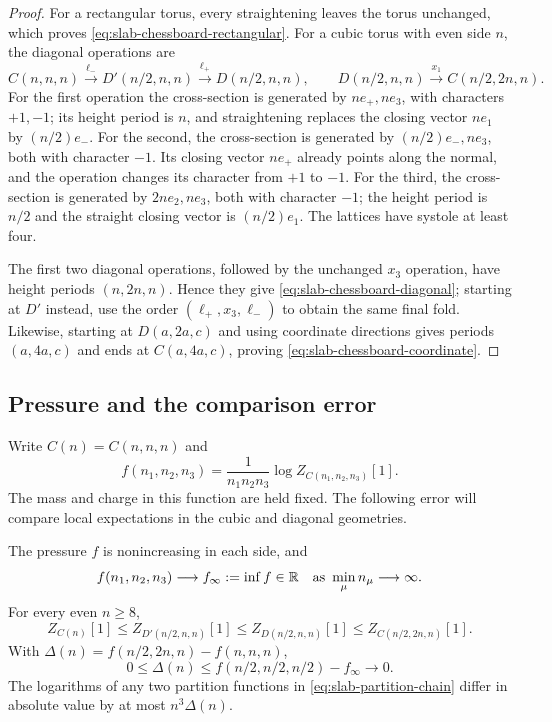 \begin{proof}
For a rectangular torus, every straightening leaves the torus unchanged,
which proves \eqref{eq:slab-chessboard-rectangular}. For a cubic torus
with even side $n$, the diagonal operations are
\begin{equation}\label{eq:slab-three-untwistings}
 C(n,n,n)\xrightarrow{\ell_-}D'(n/2,n,n)
          \xrightarrow{\ell_+}D(n/2,n,n),
 \qquad D(n/2,n,n)\xrightarrow{x_1}C(n/2,2n,n).
\end{equation}
For the first operation the cross-section is generated by $ne_+,ne_3$,
with characters $+1,-1$; its height period is $n$, and straightening
replaces the closing vector $ne_1$ by $(n/2)e_-$. For the second, the
cross-section is generated by $(n/2)e_-,ne_3$, both with character
$-1$. Its closing vector $ne_+$ already points along the normal,
and the operation changes its character from $+1$ to $-1$. For the
third, the cross-section is generated by $2ne_2,ne_3$, both with
character $-1$; the height period is $n/2$ and the straight closing
vector is $(n/2)e_1$. The lattices have systole at least four.

The first two diagonal operations, followed by the unchanged $x_3$
operation, have height periods $(n,2n,n)$. Hence they give
\eqref{eq:slab-chessboard-diagonal}; starting at $D'$ instead, use
the order $(\ell_+,x_3,\ell_-)$ to obtain the same final fold.
Likewise, starting at $D(a,2a,c)$ and using coordinate directions
gives periods $(a,4a,c)$ and ends at $C(a,4a,c)$, proving
\eqref{eq:slab-chessboard-coordinate}.
\end{proof}

\subsection{Pressure and the comparison error}\label{subsec:slab-pressure}

Write $C(n)=C(n,n,n)$ and
\[
 f(n_1,n_2,n_3)=\frac1{n_1n_2n_3}\log Z_{C(n_1,n_2,n_3)}[1].
\]
The mass and charge in this function are held fixed. The following
error will compare local expectations in the cubic and diagonal
geometries.

\begin{proposition}\label{prop:slab-pressure}
The pressure $f$ is nonincreasing in each side, and
\[
 f(n_1,n_2,n_3)\longrightarrow f_\infty:=\inf f\in\mathbb R
                     \quad\text{as }\min_\mu n_\mu\longrightarrow\infty.
\]
For every even $n\ge8$,
\begin{equation}\label{eq:slab-partition-chain}
 Z_{C(n)}[1]\le Z_{D'(n/2,n,n)}[1]
       \le Z_{D(n/2,n,n)}[1]\le Z_{C(n/2,2n,n)}[1].
\end{equation}
With $\Delta(n)=f(n/2,2n,n)-f(n,n,n)$,
\begin{equation}\label{eq:slab-pressure-error}
 0\le\Delta(n)\le f(n/2,n/2,n/2)-f_\infty\longrightarrow0.
\end{equation}
The logarithms of any two partition functions in
\eqref{eq:slab-partition-chain} differ in absolute value by at most
$n^3\Delta(n)$.
\end{proposition}


